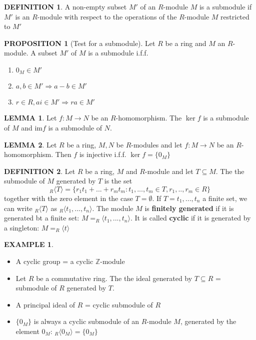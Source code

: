\documentclass[12pt]{article}
\theoremstyle{definition}
\newtheorem{definition}{DEFINITION}[subsection]
\newcommand{\image}{\text{im}}
\newtheorem{lemma}{LEMMA}[subsection]
\newtheorem{prop}{PROPOSITION}[subsection]
\newtheorem{example}{EXAMPLE}[subsection]
\begin{document}
\begin{definition}
    A non-empty subset $M'$ of an $R$-module $M$ is a submodule if $M'$ is an $R$-module with respect to the operations of the $R$-module $M$ restricted to $M'$
\end{definition}

\begin{prop}[Test for a submodule]
    Let $R$ be a ring and $M$ an $R$-module. A subset $M'$ of $M$ is a submodule i.f.f.
    \begin{enumerate}
        \item $0_M \in M'$
        \item $a,b \in M' \Rightarrow a-b \in M'$
        \item $r \in R, a i\in M' \Rightarrow ra \in M'$
    \end{enumerate}
\end{prop}

\begin{lemma}
    Let $f: M \rightarrow N$ be an $R$-homomorphism. The $\ker f$ is a submodule of $M$ and $\image f$ is a submodule of $N$.
\end{lemma}

\begin{lemma}
    Let $R$ be a ring, $M,N$ be $R$-modules and let $f: M \rightarrow N$ be an $R$-homomorphism. Then $f$ is injective i.f.f. $\ker f = \{0_M\}$
\end{lemma}

\begin{definition}
    Let $R$ be a ring, $M$ and $R$-module and let $T \subseteq M$. The the submodule of $M$ generated by $T$ is the set
    $$_R\langle T \rangle = \{r_1t_1 + ... + r_mt_m:t_1,...,t_m \in T, r_1,..,r_m \in R\}$$
    together with the zero element in the case $T = \emptyset$. If $T = {t_1, ..., t_n}$ a finite set, we can write $_R\langle T \rangle$ as $_R\langle t_1,...,t_n \rangle$. The module $M$ is \textbf{finitely generated} if it is generated bt a finite set: $M = _R\langle t_1,...,t_n \rangle$. It is called \textbf{cyclic} if it is generated by a singleton: $M = _R\langle t \rangle$
\end{definition}

\begin{example}
    \quad
    \begin{itemize}
        \item A cyclic group = a cyclic $\mathbb{Z}$-module
        \item Let $R$ be a commutative ring. The the ideal generated by $T \subseteq R$ = submodule of $R$ generated by $T$.
        \item A principal ideal of $R$ = cyclic submodule of $R$
        \item $\{0_M\}$ is always a cyclic submodule of an $R$-module $M$, generated by the element $0_M$: $_R\langle 0_M \rangle = \{0_M\}$
    \end{itemize}
\end{example}
\end{document}
